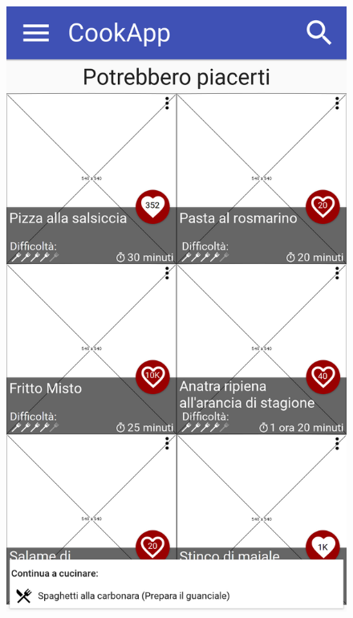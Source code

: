\begin{figure}[H]
\begin{minipage}{.49\textwidth}
		\includegraphics[width=\textwidth]{img/wireframe/homepage_continua_a_cucinare.png}
	\end{minipage}
\end{figure}
